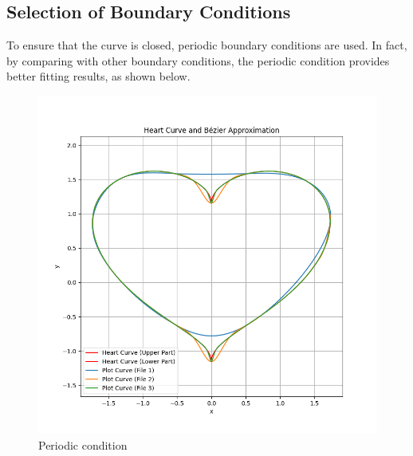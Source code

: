\documentclass[a4paper]{article}
\begin{document}
\subsection*{Selection of Boundary Conditions}

To ensure that the curve is closed, periodic boundary conditions are used. In fact, by comparing with other boundary conditions, the periodic condition provides better fitting results, as shown below.
\begin{figure}[h!]
    \centering
    \begin{minipage}{0.45\textwidth}
        \centering
        \includegraphics[width=\linewidth]{../figure/E_CCL.png}
        \caption{Periodic condition}
    \end{minipage}%
    \hfill
    \begin{minipage}{0.45\textwidth}
        \centering

\end{minipage}
\end{figure}
\end{document}
